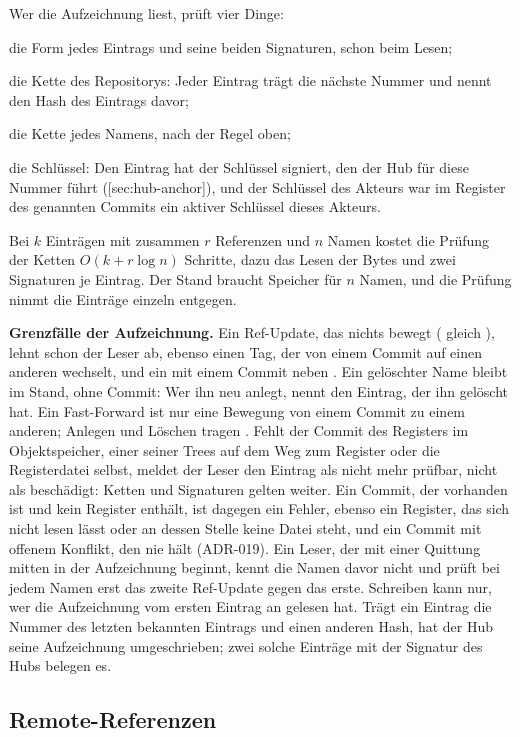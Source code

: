 Wer die Aufzeichnung liest, prüft vier Dinge:

\startitemize[n,packed]
\item die Form jedes Eintrags und seine beiden Signaturen, schon beim Lesen;
\item die Kette des Repositorys: Jeder Eintrag trägt die nächste Nummer und nennt den Hash des
Eintrags davor;
\item die Kette jedes Namens, nach der Regel oben;
\item die Schlüssel: Den Eintrag hat der Schlüssel signiert, den der Hub für diese Nummer führt
([sec:hub-anchor]), und der Schlüssel des Akteurs war im Register des genannten
Commits ein aktiver Schlüssel dieses Akteurs.
\stopitemize

Bei $k$ Einträgen mit zusammen $r$ Referenzen und $n$ Namen kostet die Prüfung der Ketten
$O(k + r \log n)$ Schritte, dazu das Lesen der Bytes und zwei Signaturen je Eintrag.
Der Stand braucht Speicher für $n$ Namen, und die Prüfung nimmt die Einträge einzeln entgegen.

\startinfobox
{\bf Grenzfälle der Aufzeichnung.}
Ein Ref-Update, das nichts bewegt ( gleich ), lehnt schon der Leser ab,
ebenso einen Tag, der von einem Commit auf einen anderen wechselt, und ein  mit einem
Commit neben .
Ein gelöschter Name bleibt im Stand, ohne Commit: Wer ihn neu anlegt, nennt den Eintrag, der ihn
gelöscht hat.
Ein Fast-Forward ist nur eine Bewegung von einem Commit zu einem anderen; Anlegen und Löschen
tragen .
Fehlt der Commit des Registers im Objektspeicher, einer seiner Trees auf dem Weg zum Register
oder die Registerdatei selbst, meldet der Leser den Eintrag als nicht mehr prüfbar, nicht als
beschädigt: Ketten und Signaturen gelten weiter.
Ein Commit, der vorhanden ist und kein Register enthält, ist dagegen ein Fehler, ebenso ein
Register, das sich nicht lesen lässt oder an dessen Stelle keine Datei steht, und ein Commit mit
offenem Konflikt, den  nie hält (ADR-019).
Ein Leser, der mit einer Quittung mitten in der Aufzeichnung beginnt, kennt die Namen davor
nicht und prüft bei jedem Namen erst das zweite Ref-Update gegen das erste.
Schreiben kann nur, wer die Aufzeichnung vom ersten Eintrag an gelesen hat.
Trägt ein Eintrag die Nummer des letzten bekannten Eintrags und einen anderen Hash, hat der Hub
seine Aufzeichnung umgeschrieben; zwei solche Einträge mit der Signatur des Hubs belegen es.
\stopinfobox

\subsection{Remote-Referenzen}

